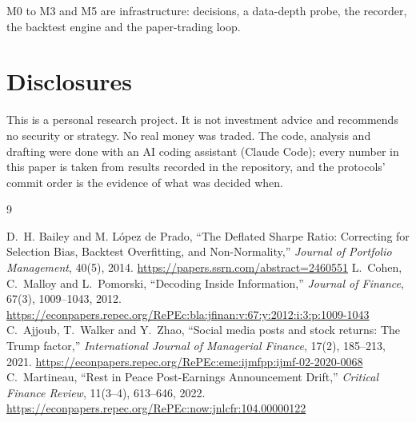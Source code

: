 \documentclass[11pt,a4paper]{article}
\begin{document}
M0 to M3 and M5 are infrastructure: decisions, a data-depth probe, the recorder, the backtest engine and the
paper-trading loop.

\section*{Disclosures}

This is a personal research project. It is not investment advice and recommends no security or strategy. No real money was
traded. The code, analysis and drafting were done with an AI coding assistant (Claude Code); every number in this paper is
taken from results recorded in the repository, and the protocols' commit order is the evidence of what was decided when.

\renewcommand{\refname}{References}
\small
\begin{thebibliography}{9}
 D.~H. Bailey and M. L\'opez de Prado, ``The Deflated Sharpe Ratio: Correcting for Selection Bias,
  Backtest Overfitting, and Non-Normality,'' \emph{Journal of Portfolio Management}, 40(5), 2014.
  \url{https://papers.ssrn.com/abstract=2460551}
 L.~Cohen, C.~Malloy and L.~Pomorski, ``Decoding Inside Information,'' \emph{Journal of Finance},
  67(3), 1009--1043, 2012. \url{https://econpapers.repec.org/RePEc:bla:jfinan:v:67:y:2012:i:3:p:1009-1043}
 C.~Ajjoub, T.~Walker and Y.~Zhao, ``Social media posts and stock returns: The Trump factor,''
  \emph{International Journal of Managerial Finance}, 17(2), 185--213, 2021.
  \url{https://econpapers.repec.org/RePEc:eme:ijmfpp:ijmf-02-2020-0068}
 C.~Martineau, ``Rest in Peace Post-Earnings Announcement Drift,'' \emph{Critical Finance Review},
  11(3--4), 613--646, 2022. \url{https://econpapers.repec.org/RePEc:now:jnlcfr:104.00000122}
\end{thebibliography}
\end{document}
